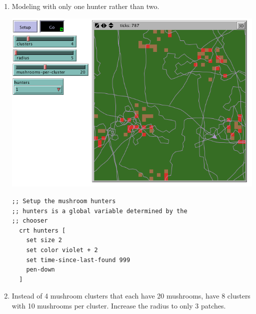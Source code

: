 \documentclass{hw}
\begin{document}

\begin{enumerate}
\item Modeling with only one hunter rather than two.

\begin{minipage}{0.5\textwidth}
\includegraphics[scale=0.35]{one_hunter.png}
\end{minipage}
\begin{minipage}{0.5\textwidth}
\begin{verbatim}
;; Setup the mushroom hunters
;; hunters is a global variable determined by the
;; chooser
  crt hunters [
    set size 2
    set color violet + 2
    set time-since-last-found 999
    pen-down
  ]
\end{verbatim}
\end{minipage}

\item Instead of 4 mushroom clusters that each have 20 mushrooms, have 8 clusters with 10 mushrooms per
cluster. Increase the radius to only 3 patches.


\end{enumerate}
\end{document}
